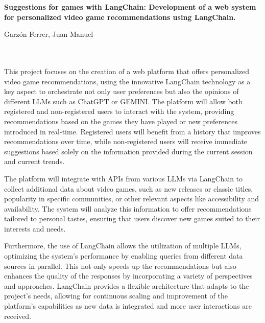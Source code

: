 \newpage
\begin{center}
{\large\bfseries Suggestions for games with LangChain: Development of a web system for personalized video game recommendations using LangChain.}\\
\end{center}
\begin{center}
Garzón Ferrer, Juan Manuel\\
\end{center}

\\

\vspace{0.7cm}
\\

This project focuses on the creation of a web platform that offers personalized video game recommendations, using the innovative LangChain technology as a key aspect to orchestrate not only user preferences but also the opinions of different LLMs such as ChatGPT or GEMINI. The platform will allow both registered and non-registered users to interact with the system, providing recommendations based on the games they have played or new preferences introduced in real-time. Registered users will benefit from a history that improves recommendations over time, while non-registered users will receive immediate suggestions based solely on the information provided during the current session and current trends.

The platform will integrate with APIs from various LLMs via LangChain to collect additional data about video games, such as new releases or classic titles, popularity in specific communities, or other relevant aspects like accessibility and availability. The system will analyze this information to offer recommendations tailored to personal tastes, ensuring that users discover new games suited to their interests and needs.

Furthermore, the use of LangChain allows the utilization of multiple LLMs, optimizing the system's performance by enabling queries from different data sources in parallel. This not only speeds up the recommendations but also enhances the quality of the responses by incorporating a variety of perspectives and approaches. LangChain provides a flexible architecture that adapts to the project's needs, allowing for continuous scaling and improvement of the platform’s capabilities as new data is integrated and more user interactions are received.



